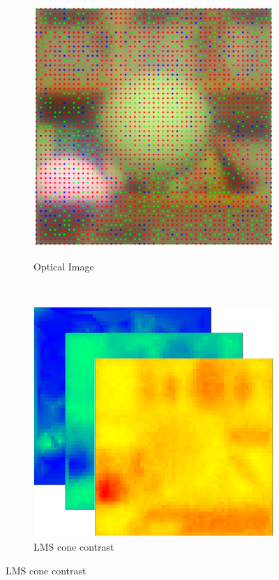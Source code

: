 \documentclass{jov}
\begin{document}
\begin{figure}
\begin{subfigure}[b]{0.19 \textwidth}
        \label{fig:croppedImage}
    \end{subfigure}
    ~ 
    \begin{subfigure}[b]{0.19 \textwidth}
    \hspace{0.1 \textwidth}
        \caption{Optical Image}
        \vspace{1.5mm}
        \includegraphics[width=\textwidth]{../Figures/Figure8/Figure8_c.png}
        \label{fig:croppedImageWithMosaic}
    \end{subfigure}
    ~
    \begin{subfigure}[b]{0.2 \textwidth}
        \caption{LMS cone contrast}
        \includegraphics[width=\textwidth]{../Figures/Figure8/Figure8_d.png}

\end{subfigure}
\end{figure}
\end{document}
